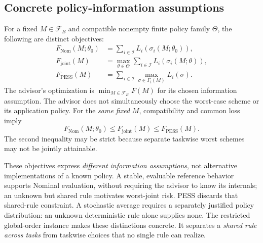 \documentclass[sigconf, nonacm]{acmart}
\newcommand{\Tasks}{\mathcal I}
\newcommand{\PESS}{\operatorname{PESS}}
\newcommand{\Nom}{\operatorname{Nom}}
\begin{document}
\subsection{Concrete policy-information assumptions}
For a fixed \(M\in\mathcal F_B\) and compatible nonempty finite
policy family \(\Theta\), the following are distinct objectives:
\begin{align}
F_{\Nom}(M;\theta_0)
 &=\sum_{i\in\Tasks}L_i(\sigma_i(M;\theta_0)),\label{eq:nom}\\
F_{\mathrm{joint}}(M)
 &=\max_{\theta\in\Theta}\sum_{i\in\Tasks}
 L_i(\sigma_i(M;\theta)),\label{eq:joint}\\
F_{\PESS}(M)
 &=\sum_{i\in\Tasks}\max_{\sigma\in\Gamma_i(M)}
 L_i(\sigma).\label{eq:pess}
\end{align}
The advisor's optimization is \(\min_{M\in\mathcal F_B}F(M)\)
for its chosen information assumption. The advisor does not
simultaneously choose the worst-case scheme or its application
policy. For the \emph{same fixed} \(M\), compatibility and common
loss imply
\begin{equation}
\label{eq:genericbound}
F_{\Nom}(M;\theta_0)\leq
F_{\mathrm{joint}}(M)\leq F_{\PESS}(M).
\end{equation}
The second inequality may be strict because separate taskwise
worst schemes may not be jointly attainable.

These objectives express \emph{different information
assumptions}, not alternative implementations of a known
policy. A stable, evaluable reference behavior supports Nominal
evaluation, without requiring the advisor to know its internals;
an unknown but shared rule motivates worst-joint risk. PESS discards that shared-rule constraint. A stochastic
average requires a separately justified policy distribution:
an unknown deterministic rule alone supplies none.
The restricted global-order instance makes these distinctions
concrete. It separates a \emph{shared rule across tasks}
from taskwise choices that no single rule can realize.
\end{document}

